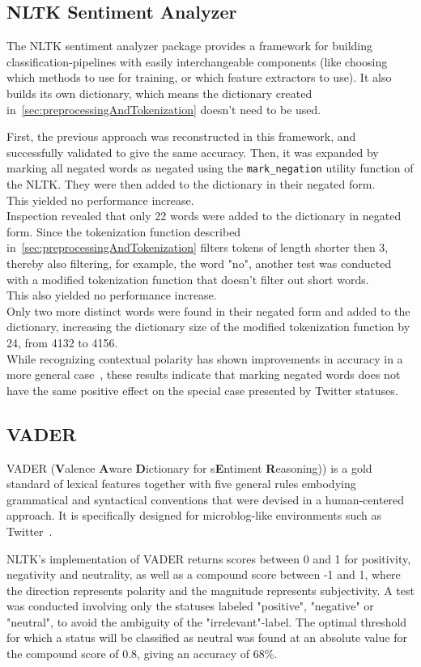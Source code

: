 \subsection{NLTK Sentiment Analyzer}
\label{subsec:nltksentimentanalyzer}

The NLTK sentiment analyzer package provides a framework for building classification-pipelines with easily interchangeable components
(like choosing which methods to use for training, or which feature extractors to use).
It also builds its own dictionary, which means the dictionary created in~\ref{sec:preprocessingAndTokenization} doesn't need to be used.
\par
First, the previous approach was reconstructed in this framework, and successfully validated to give the same accuracy.
Then, it was expanded by marking all negated words as negated using the \texttt{mark\_negation} utility function of the NLTK.
They were then added to the dictionary in their negated form.
\\
This yielded no performance increase.
\\
Inspection revealed that only 22 words were added to the dictionary in negated form.
Since the tokenization function described in~\ref{sec:preprocessingAndTokenization} filters tokens of length shorter then 3,
thereby also filtering, for example, the word "no", another test was conducted with a modified tokenization function that doesn't filter out short words.
\\
This also yielded no performance increase.
\\
Only two more distinct words were found in their negated form and added to the dictionary,
increasing the dictionary size of the modified tokenization function by 24, from 4132 to 4156.
\\
While recognizing contextual polarity has shown improvements in accuracy in a more general case~\cite{Hoffmann2005},
these results indicate that marking negated words does not have the same positive effect on the special case presented by Twitter statuses.

\subsection{VADER}
\label{subsec:vader}

VADER (\textbf{V}alence \textbf{A}ware \textbf{D}ictionary for s\textbf{E}ntiment \textbf{R}easoning))
is a gold standard of lexical features together with five general rules embodying grammatical and syntactical conventions
that were devised in a human-centered approach.
It is specifically designed for microblog-like environments such as Twitter~\cite{Hutto2014}.
\par
NLTK's implementation of VADER returns scores between 0 and 1 for positivity, negativity and neutrality,
as well as a compound score between -1 and 1, where the direction represents polarity and the magnitude represents subjectivity.
A test was conducted involving only the statuses labeled "positive", "negative" or "neutral",
to avoid the ambiguity of the "irrelevant"-label.
The optimal threshold for which a status will be classified as neutral was found
at an absolute value for the compound score of 0.8, giving an accuracy of 68\%.

